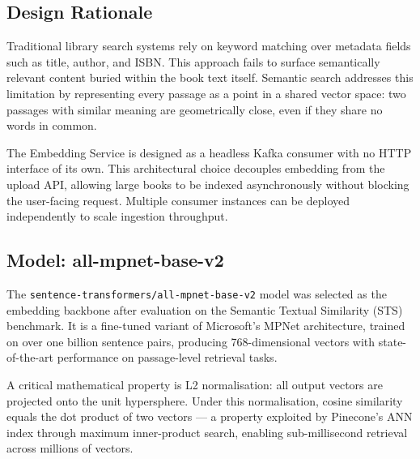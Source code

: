 \subsection{Design Rationale}

Traditional library search systems rely on keyword matching over metadata
fields such as title, author, and ISBN. This approach fails to surface
semantically relevant content buried within the book text itself. Semantic
search addresses this limitation by representing every passage as a point in
a shared vector space: two passages with similar meaning are geometrically
close, even if they share no words in common.

The Embedding Service is designed as a headless Kafka consumer with no HTTP
interface of its own. This architectural choice decouples embedding from the
upload API, allowing large books to be indexed asynchronously without blocking
the user-facing request. Multiple consumer instances can be deployed
independently to scale ingestion throughput.

\subsection{Model: all-mpnet-base-v2}

The \texttt{sentence-transformers/all-mpnet-base-v2} model was selected as the
embedding backbone after evaluation on the Semantic Textual Similarity (STS)
benchmark. It is a fine-tuned variant of Microsoft's MPNet architecture,
trained on over one billion sentence pairs, producing 768-dimensional vectors
with state-of-the-art performance on passage-level retrieval tasks.

A critical mathematical property is L2 normalisation: all output vectors are
projected onto the unit hypersphere. Under this normalisation, cosine
similarity equals the dot product of two vectors --- a property exploited by
Pinecone's ANN index through maximum inner-product search, enabling
sub-millisecond retrieval across millions of vectors.

